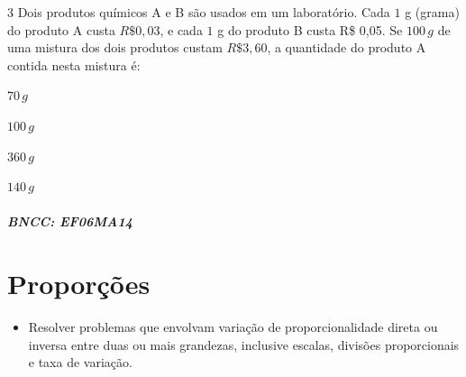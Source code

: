 \num{3}  Dois produtos químicos A e B são usados em um laboratório. Cada $1$ g
(grama) do produto A custa $R\$0,03$, e cada $1$ g do produto B custa R\$
0,05. Se $100\,g$ de uma mistura dos dois produtos custam $R\$3,60$, a
quantidade do produto A contida nesta mistura é:

\begin{escolha}
\item $70\,g$
\item $100\,g$
\item $360\,g$
\item $140\,g$
\end{escolha}

\paragraph{BNCC: EF06MA14 }


\chapter{Proporções}

\begin{itemize}
\item Resolver problemas que envolvam variação de
proporcionalidade direta ou inversa entre duas ou mais grandezas,
inclusive escalas, divisões proporcionais e taxa de variação.
\end{itemize}

